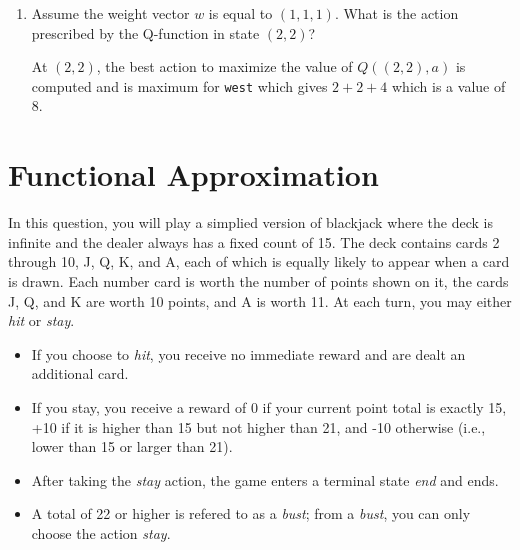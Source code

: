 \documentclass[12pt]{article}
\begin{document}
\begin{enumerate}
\begin{enumerate}
  Using the equation for the $Q$-learning,

  \begin{align*}
    w_{i} &= w_{i} + \alpha\left[R(s,a,s^{\prime}) + \gamma\max_{a^{\prime}}Q(s^{\prime},a^{\prime}) - Q(s,a)\right]f_{i}(s,a)
    \intertext{In calculating this for the first weight, we get}
    w_{1} &= 0 + 0.5\left[ -100 + 0.5(0)\right]f_{1}\left((2,2)\right)\\
         &= 0 + 0.5\left[ -100 + 0.5(0)\right]2 = -100
    \end{align*}

    which when plugging in the values, we get $-100$ for each of the weights for the first episode.

  \item Assume the weight vector $w$ is equal to $(1, 1, 1)$.  What is
  the action prescribed by the Q-function in state $(2,2)$?

At $(2,2)$, the best action to maximize the value of $Q((2,2),a)$ is computed and is maximum for {\tt west} which gives $2+2+4$ which is a value of $8$.

  \end{enumerate}

\end{enumerate}

\clearpage

\section{Functional Approximation}

In this question, you will play a simplied version of blackjack where
the deck is infinite and the dealer always has a fixed count of 15.
The deck contains cards 2 through 10, J, Q, K, and A, each of which is
equally likely to appear when a card is drawn.  Each number card is
worth the number of points shown on it, the cards J, Q, and K are
worth 10 points, and A is worth 11.  At each turn, you may either {\it
  hit} or {\it stay}.

\begin{itemize}

\item If you choose to {\it hit}, you receive no immediate reward and
  are dealt an additional card.  

\item If you stay, you receive a reward of 0 if your current point
  total is exactly 15, +10 if it is higher than 15 but not higher than
  21, and -10 otherwise (i.e., lower than 15 or larger than 21).

\item After taking the {\it stay} action, the game enters a terminal
  state {\it end} and ends.

\item A total of 22 or higher is refered to as a {\it bust}; from a
  {\it bust}, you can only choose the action {\it stay}.

\end{itemize}
\end{document}
